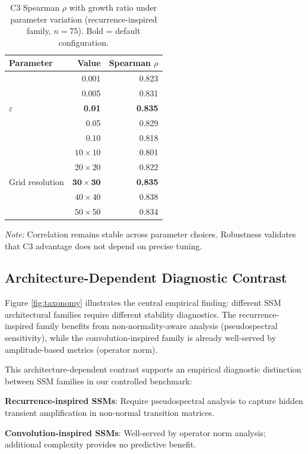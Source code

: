 \documentclass[twoside]{article}
\begin{document}
\begin{table}[H]
\caption{C3 Spearman $\rho$ with growth ratio under parameter variation (recurrence-inspired family, $n=75$). Bold = default configuration.}
\label{tab:ablation}
\centering
\begin{tabular}{lrr}
\toprule
Parameter & Value & Spearman $\rho$ \\
\midrule
\multirow{5}{*}{$\varepsilon$} & 0.001 & 0.823 \\
 & 0.005 & 0.831 \\
 & \textbf{0.01} & \textbf{0.835} \\
 & 0.05 & 0.829 \\
 & 0.10 & 0.818 \\
\midrule
\multirow{5}{*}{Grid resolution} & $10\times10$ & 0.801 \\
 & $20\times20$ & 0.822 \\
 & $\mathbf{30\times30}$ & \textbf{0.835} \\
 & $40\times40$ & 0.838 \\
 & $50\times50$ & 0.834 \\
\bottomrule
\end{tabular}
\par\smallskip
{\footnotesize \textit{Note:} Correlation remains stable across parameter choices.
Robustness validates that C3 advantage does not depend on precise tuning.}
\end{table}

\subsection{Architecture-Dependent Diagnostic Contrast}

Figure \ref{fig:taxonomy} illustrates the central empirical finding: different SSM architectural families require different stability diagnostics. The recurrence-inspired family benefits from non-normality-aware analysis (pseudospectral sensitivity), while the convolution-inspired family is already well-served by amplitude-based metrics (operator norm).

This architecture-dependent contrast supports an empirical diagnostic distinction between SSM families in our controlled benchmark:

\textbf{Recurrence-inspired SSMs}: Require pseudospectral analysis to capture hidden transient amplification in non-normal transition matrices.

\textbf{Convolution-inspired SSMs}: Well-served by operator norm analysis; additional complexity provides no predictive benefit.
\end{document}

